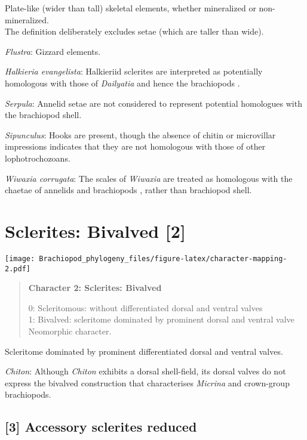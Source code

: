 \documentclass[openany]{book}
\theoremstyle{definition}
\theoremstyle{definition}
\theoremstyle{definition}
\theoremstyle{remark}
\begin{document}
Plate-like (wider than tall) skeletal elements, whether mineralized or
non-mineralized.\\
The definition deliberately excludes setae (which are taller than wide).

\hypertarget{Flustra-coding-1}{}
\emph{Flustra}: Gizzard elements.

\hypertarget{Halkieria_evangelista-coding-1}{}
\emph{Halkieria evangelista}: Halkieriid sclerites are interpreted as
potentially homologous with those of \emph{Dailyatia} and hence the
brachiopods \citep{Zhao2017}.

\hypertarget{Serpula-coding-1}{}
\emph{Serpula}: Annelid setae are not considered to represent potential
homologues with the brachiopod shell.

\hypertarget{Sipunculus-coding-1}{}
\emph{Sipunculus}: Hooks are present, though the absence of chitin or
microvillar impressions indicates that they are not homologous with
those of other lophotrochozoans.

\hypertarget{Wiwaxia_corrugata-coding-1}{}
\emph{Wiwaxia corrugata}: The scales of \emph{Wiwaxia} are treated as
homologous with the chaetae of annelids and brachiopods
\citep{Butterfield1990, Smith2014, Zhang2015}, rather than brachiopod
shell.

\section{Sclerites: Bivalved {[}2{]}}\label{sclerites-bivalved-2}

\texttt{[image: Brachiopod\_phylogeny\_files/figure-latex/character-mapping-2.pdf]}

\begin{quote}
\textbf{Character 2: Sclerites: Bivalved}

0: Scleritomous: without differentiated dorsal and ventral valves\\
1: Bivalved: scleritome dominated by prominent dorsal and ventral
valve\\
Neomorphic character.
\end{quote}

Scleritome dominated by prominent differentiated dorsal and ventral
valves.

\hypertarget{Chiton-coding-2}{}
\emph{Chiton}: Although \emph{Chiton} exhibits a dorsal shell-field, its
dorsal valves do not express the bivalved construction that
characterises \emph{Micrina} and crown-group brachiopods.

\subsection*{{[}3{]} Accessory sclerites
reduced}\label{accessory-sclerites-reduced}
\end{document}
